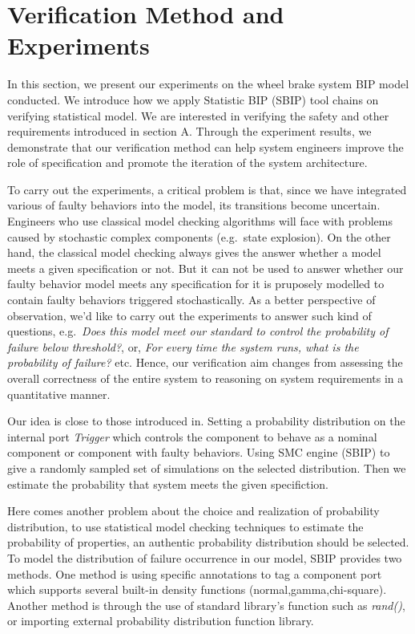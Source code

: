 

\section{Verification Method and Experiments}

In this section, we present our experiments on the wheel brake system BIP model conducted. We introduce how we apply Statistic BIP (SBIP) tool chains on verifying statistical model. We are interested in verifying the safety and other requirements introduced in section A. Through the experiment results, we demonstrate that our verification method can help system engineers improve the role of specification and promote the iteration of the system architecture.

To carry out the experiments, a critical problem is that, since we have integrated various of faulty behaviors into the model, its transitions become uncertain. Engineers who use classical model checking algorithms will face with problems caused by stochastic complex components (e.g.\ state explosion). On the other hand, the classical model checking always gives the answer whether a model meets a given specification or not. But it can not be used to answer whether our faulty behavior model meets any specification for it is pruposely modelled to contain faulty behaviors triggered stochastically. As a better perspective of observation, we'd like to carry out the experiments to answer such kind of questions, e.g.\ \emph{Does this model meet our standard to control the probability of failure below threshold?}, or, \emph{For every time the system runs, what is the probability of failure?} etc. Hence, our verification aim changes from assessing the overall correctness of the entire system to reasoning on system requirements in a quantitative manner.

Our idea is close to those introduced in\cite{smc10}\cite{smc10'}. Setting a probability distribution on the internal port \emph{Trigger} which controls the component to behave as a nominal component or component with faulty behaviors. Using SMC engine (SBIP) to give a randomly sampled set of simulations on the selected distribution. Then we estimate the probability that system meets the given specifiction. 

Here comes another problem about the choice and realization of probability distribution, to use statistical model checking techniques to estimate the probability of properties, an authentic probability distribution should be selected. To model the distribution of failure occurrence in our model, SBIP provides two methods. One method is using specific annotations to tag a component port which supports several built-in density functions (normal,gamma,chi-square). Another method is through the use of standard library's function such as \emph{rand()}, or importing external probability distribution function library.

